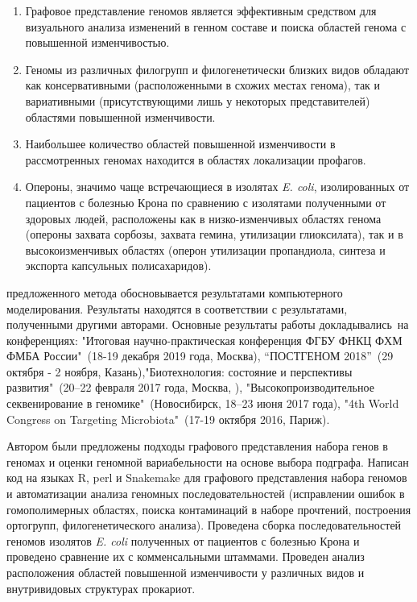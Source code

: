 {}
\begin{enumerate}[beginpenalty=10000] %
	\item Графовое представление геномов является эффективным средством для визуального анализа изменений в генном составе и поиска областей генома с повышенной изменчивостью.

	\item Геномы из различных филогрупп и филогенетически близких видов обладают как консервативными (расположенными в схожих местах генома), так и вариативными (присутствующими лишь у некоторых представителей) областями повышенной изменчивости.

 	\item Наибольшее количество областей повышенной изменчивости в рассмотренных геномах находится в областях локализации профагов.

	\item Опероны, значимо чаще встречающиеся в изолятах \textit{E. coli}, изолированных от пациентов с болезнью Крона по сравнению с изолятами полученными от здоровых людей, расположены как в низко-изменчивых областях генома (опероны захвата сорбозы, захвата гемина, утилизации глиоксилата), так и в высокоизменчивых областях (оперон утилизации пропандиола, синтеза и экспорта капсульных полисахаридов).

\end{enumerate}


{\reliability} предложенного метода обосновывается результатами компьютерного моделирования. Результаты находятся в соответствии с результатами, полученными другими авторами. Основные результаты работы докладывались~на конференциях: "Итоговая научно-практическая конференция ФГБУ ФНКЦ ФХМ ФМБА России"\ (18-19 декабря 2019 года, Москва), “ПОСТГЕНОМ 2018”\ (29 октября - 2 ноября, Казань),"Биотехнология: состояние и перспективы развития"\ (20–22 февраля 2017 года, Москва, ), "Высокопроизводительное секвенирование в геномике"\ (Новосибирск, 18–23 июня 2017 года), "4th World Congress on Targeting Microbiota"\ (17-19 октября 2016, Париж).


{\contribution} 
Автором были предложены подходы графового представления набора генов в геномах и оценки геномной вариабельности на основе выбора подграфа. Написан код на языках R, perl и Snakemake для графового представления набора геномов и автоматизации анализа геномных последовательностей (исправлении ошибок в гомополимерных областях, поиска контаминаций в наборе прочтений, построения ортогрупп, филогенетического анализа). Проведена сборка последовательностей геномов изолятов \textit{E. coli} полученных от пациентов с болезнью Крона и проведено сравнение их с комменсальными штаммами. Проведен анализ расположения областей повышенной изменчивости у различных видов и внутривидовых структурах прокариот.

